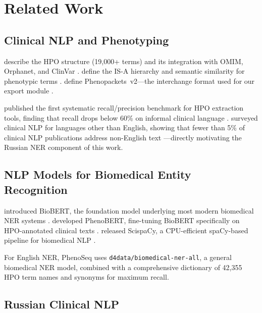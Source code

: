 \documentclass[11pt,a4paper]{article}
\begin{document}
\section{Related Work}

\subsection{Clinical NLP and Phenotyping}

\citeauthor{kohler2021} describe the HPO structure (19{,}000+ terms) and its
integration with OMIM, Orphanet, and ClinVar \cite{kohler2021}.
\citeauthor{robinson2010} define the IS-A hierarchy and semantic similarity
for phenotypic terms \cite{robinson2010}.  \citeauthor{jacobsen2022} define
Phenopackets~v2---the interchange format used for our export module
\cite{jacobsen2022}.

\citeauthor{groza2015} published the first systematic recall/precision
benchmark for HPO extraction tools, finding that recall drops below 60\% on
informal clinical language \cite{groza2015}.  \citeauthor{nevéol2018} surveyed
clinical NLP for languages other than English, showing that fewer than 5\% of
clinical NLP publications address non-English text \cite{nevéol2018}---directly
motivating the Russian NER component of this work.

\subsection{NLP Models for Biomedical Entity Recognition}

\citeauthor{lee2020} introduced BioBERT, the foundation model underlying most
modern biomedical NER systems \cite{lee2020}.  \citeauthor{huang2022} developed
PhenoBERT, fine-tuning BioBERT specifically on HPO-annotated clinical texts
\cite{huang2022}.  \citeauthor{neumann2019} released ScispaCy, a
CPU-efficient spaCy-based pipeline for biomedical NLP \cite{neumann2019}.

For English NER, PhenoSeq uses \texttt{d4data/biomedical-ner-all}, a general
biomedical NER model, combined with a comprehensive dictionary of 42{,}355 HPO
term names and synonyms for maximum recall.

\subsection{Russian Clinical NLP}
\end{document}
